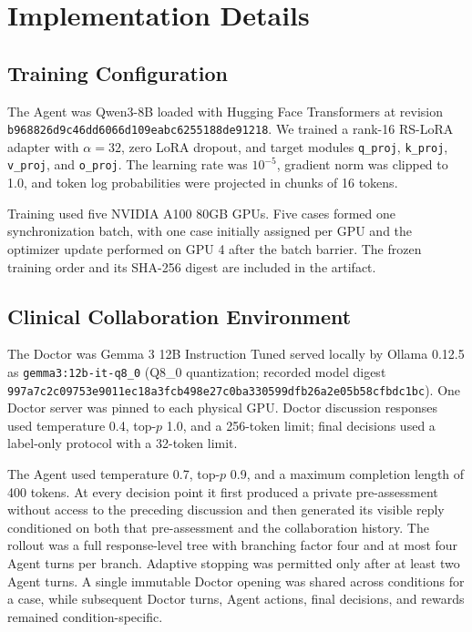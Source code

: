 \section{Implementation Details}
\label{app:implementation_details}

\subsection{Training Configuration}

The Agent was Qwen3-8B loaded with Hugging Face Transformers at revision
\texttt{b968826d9c46dd6066d109eabc6255188de91218}.  We trained a rank-16
RS-LoRA adapter with $\alpha=32$, zero LoRA dropout, and target modules
\texttt{q\_proj}, \texttt{k\_proj}, \texttt{v\_proj}, and
\texttt{o\_proj}.  The learning rate was $10^{-5}$, gradient norm was clipped
to 1.0, and token log probabilities were projected in chunks of 16 tokens.

Training used five NVIDIA A100 80GB GPUs. Five cases formed one synchronization
batch, with one case initially assigned per GPU and the optimizer update
performed on GPU 4 after the batch barrier. The frozen training order and its
SHA-256 digest are included in the artifact.

\subsection{Clinical Collaboration Environment}

The Doctor was Gemma 3 12B Instruction Tuned served locally by Ollama 0.12.5 as
\texttt{gemma3:12b-it-q8\_0} (Q8\_0 quantization; recorded model digest
\texttt{997a7c2c09753e9011ec18a3fcb498e27c0ba330599dfb26a2e05b58cfbdc1bc}).
One Doctor server was pinned to each physical GPU.  Doctor discussion responses
used temperature 0.4, top-$p$ 1.0, and a 256-token limit; final decisions used a
label-only protocol with a 32-token limit.

The Agent used temperature 0.7, top-$p$ 0.9, and a maximum completion length of
400 tokens.  At every decision point it first produced a private pre-assessment
without access to the preceding discussion and then generated its visible reply
conditioned on both that pre-assessment and the collaboration history.  The
rollout was a full response-level tree with branching factor four and at most
four Agent turns per branch.  Adaptive stopping was permitted only after at
least two Agent turns.  A single immutable Doctor opening was shared across
conditions for a case, while subsequent Doctor turns, Agent actions, final
decisions, and rewards remained condition-specific.

